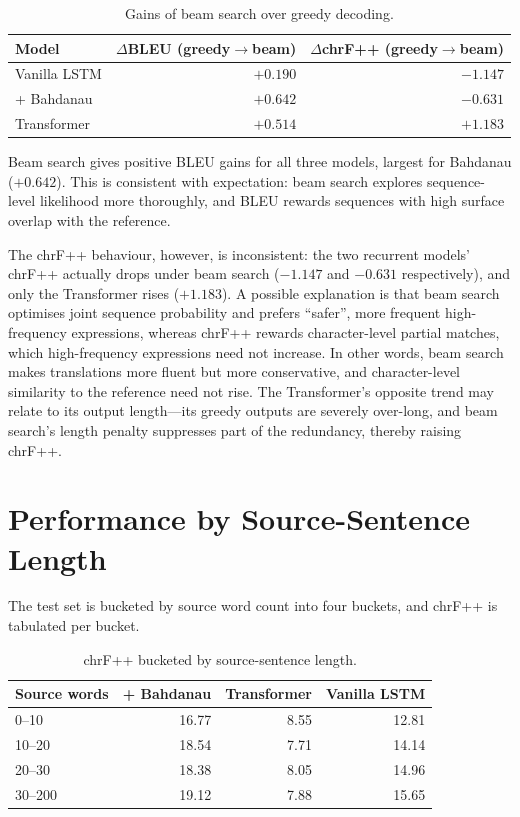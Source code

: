 \documentclass[a4paper,12pt]{vpcoe}
\begin{document}
\begin{table}[h]
\centering
\caption{Gains of beam search over greedy decoding.}
\label{tab:beam}
\begin{tabular}{@{}lrr@{}}
\toprule
Model & $\Delta$BLEU (greedy$\rightarrow$beam) & $\Delta$chrF++ (greedy$\rightarrow$beam) \\
\midrule
Vanilla LSTM & $+0.190$ & $-1.147$ \\
+ Bahdanau & $+0.642$ & $-0.631$ \\
Transformer & $+0.514$ & $+1.183$ \\
\bottomrule
\end{tabular}
\end{table}

Beam search gives positive BLEU gains for all three models, largest for Bahdanau ($+0.642$). This is consistent with expectation: beam search explores sequence-level likelihood more thoroughly, and BLEU rewards sequences with high surface overlap with the reference.

The chrF++ behaviour, however, is inconsistent: the two recurrent models' chrF++ actually drops under beam search ($-1.147$ and $-0.631$ respectively), and only the Transformer rises ($+1.183$). A possible explanation is that beam search optimises joint sequence probability and prefers ``safer'', more frequent high-frequency expressions, whereas chrF++ rewards character-level partial matches, which high-frequency expressions need not increase. In other words, beam search makes translations more fluent but more conservative, and character-level similarity to the reference need not rise. The Transformer's opposite trend may relate to its output length---its greedy outputs are severely over-long, and beam search's length penalty suppresses part of the redundancy, thereby raising chrF++.

\section{Performance by Source-Sentence Length}
The test set is bucketed by source word count into four buckets, and chrF++ is tabulated per bucket.

\begin{table}[h]
\centering
\caption{chrF++ bucketed by source-sentence length.}
\label{tab:length}
\begin{tabular}{@{}lrrr@{}}
\toprule
Source words & + Bahdanau & Transformer & Vanilla LSTM \\
\midrule
0--10   & 16.77 & 8.55 & 12.81 \\
10--20  & 18.54 & 7.71 & 14.14 \\
20--30  & 18.38 & 8.05 & 14.96 \\
30--200 & 19.12 & 7.88 & 15.65 \\
\bottomrule
\end{tabular}
\end{table}
\end{document}
